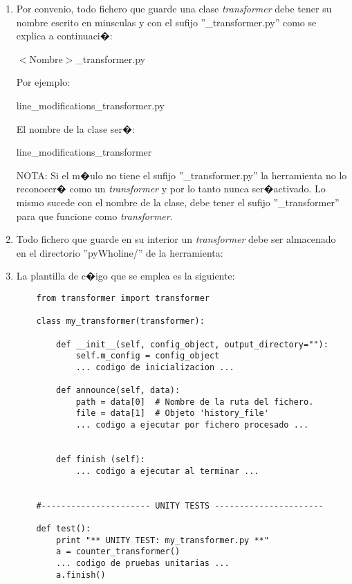 \documentclass[a4paper,10pt]{book}
\begin{document}
\begin{enumerate}
\item Por convenio, todo fichero que guarde una clase \textit{transformer} debe tener su
nombre escrito en minsculas y con el sufijo ''\_transformer.py'' como se explica
a continuaci�:\\
    \begin{center}
    $<$Nombre$>$\_transformer.py
    \end{center}
    Por ejemplo:
    \begin{center}
    line\_modifications\_transformer.py
    \end{center}
    El nombre de la clase ser�:
    \begin{center}
    line\_modifications\_transformer
    \end{center}

NOTA: Si el m�ulo no tiene el sufijo ''\_transformer.py'' la herramienta no lo reconocer�
como un \textit{transformer} y por lo tanto nunca ser�activado. Lo mismo sucede con
el nombre de la clase, debe tener el sufijo ''\_transformer'' para que funcione como
\textit{transformer}.

\item Todo fichero que guarde en su interior un \textit{transformer} debe ser almacenado
en el directorio ''pyWholine/'' de la herramienta:

\item La plantilla de c�igo que se emplea es la siguiente:

    \begin{verbatim}
    from transformer import transformer

    class my_transformer(transformer):

        def __init__(self, config_object, output_directory=""):
            self.m_config = config_object
            ... codigo de inicializacion ...

        def announce(self, data):
            path = data[0]  # Nombre de la ruta del fichero.
            file = data[1]  # Objeto 'history_file'
            ... codigo a ejecutar por fichero procesado ...


        def finish (self):
            ... codigo a ejecutar al terminar ...


    #---------------------- UNITY TESTS ----------------------

    def test():
        print "** UNITY TEST: my_transformer.py **"
        a = counter_transformer()
        ... codigo de pruebas unitarias ...
        a.finish()


\end{verbatim}
\end{enumerate}
\end{document}
